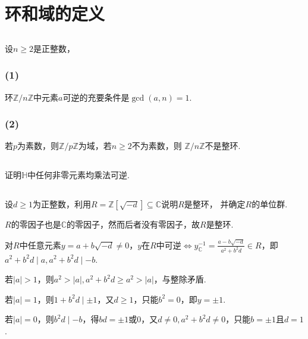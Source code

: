 \section{环和域的定义}
\subsection{}
设$n\geq 2$是正整数，
\subsubsection{(1)}
环$\mathbb{Z}/n\mathbb{Z}$中元素$a$可逆的充要条件是$\gcd(a,n)=1$.
\subsubsection{(2)}
若$p$为素数，则$\mathbb{Z}/p\mathbb{Z}$为域，若$n\geq 2$不为素数，则
$\mathbb{Z}/n\mathbb{Z}$不是整环.

\Proofbyintimidation

\subsection{}
证明$\mathbb{H}$中任何非零元素均乘法可逆.


\subsection{}
设$d\geq 1$为正整数，利用$R=\mathbb{Z}[\sqrt{-d}]\subseteq \mathbb{C}$说明$R$是整环，
并确定$R$的单位群.

\jie $R$的零因子也是$\mathbb{C}$的零因子，然而后者没有零因子，故$R$是整环.

对$R$中任意元素$y=a+b\sqrt{-d}\neq 0$，$y$在$R$中可逆$\Leftrightarrow
y^{-1}_{\mathbb{C}}=\frac{a-b\sqrt{-d}}{a^2+b^2d}\in R$，即$a^2+b^2d\mid a, a^2+b^2d\mid -b$.

若$|a|>1$，则$a^2>|a|,a^2+b^2d\geq a^2>|a|$，与整除矛盾.

若$|a|=1$，则$1+b^2d\mid \pm1$，又$d\geq 1$，只能$b^2=0$，即$y=\pm 1$.

若$|a|=0$，则$b^2d\mid -b$，得$bd=\pm 1$或$0$，又$d\neq 0, a^2+b^2d\neq 0$，只能$b=\pm 1$且$d=1$.

